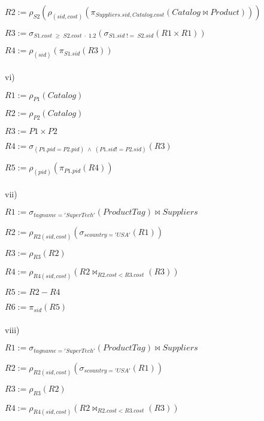 \documentclass[10pt]{article}
\begin{document}
$R2 := \rho_{S2}(\rho_{(sid, cost)}(\pi_{Suppliers.sid, Catalog.cost}(Catalog \bowtie Product)))$

$R3 := \sigma_{S1.cost\;\geq\; S2.cost \; \cdot \;1.2 }(\sigma_{S1.sid\;!= \;S2.sid}(R1 \times R1))$

$R4 := \rho_{(sid)}(\pi_{S1.sid}(R3))$
\\~\\
vi)

$R1 := \rho_{P1}(Catalog)$

$R2 := \rho_{P2}(Catalog)$

$R3 := P1 \times P2$

$R4 := \sigma_{(P1.pid = P2.pid)\; \wedge\; (P1.sid != P2.sid)}(R3)$

$R5 := \rho_{(pid)}(\pi_{P1.pid}(R4))$
\\~\\
vii)

$R1 := \sigma_{tagname='Super Tech'}(ProductTag) \bowtie Suppliers$

$R2 := \rho_{R2(sid, cost)}(\sigma_{scountry = 'USA'}(R1))$

$R3 := \rho_{R3}(R2)$

$R4 := \rho_{R4(sid, cost)}(R2 \bowtie_{R2.cost < R3.cost}(R3))$

$R5 := R2 - R4$

$R6 := \pi_{sid}(R5)$
\\~\\
viii)

$R1 := \sigma_{tagname='Super Tech'}(ProductTag) \bowtie Suppliers$

$R2 := \rho_{R2(sid, cost)}(\sigma_{scountry = 'USA'}(R1))$

$R3 := \rho_{R3}(R2)$

$R4 := \rho_{R4(sid, cost)}(R2 \bowtie_{R2.cost < R3.cost}(R3))$

$R5 := R2 - R4$ [Most Expensive]

$R6 := R2 - R5$ [Table excluding most expensive]

$R7 := \rho_{R7(sid, cost)}(\sigma_{scountry = 'USA'}(R6))$

$R8 := \rho_{R8}(R7)$

$R9 := \rho_{R9(sid, cost)}(R7 \bowtie_{R7.cost < R8.cost}(R8))$

$R10 := R6 - R9$

$R11 := \pi_{sid}(R10)$
\\~\\
ix)

$R1 := \rho_{R1(pid, sid, cost)}(\pi_{Product.pid, Suppliers.sid}(Product \bowtie Catalog))$
\end{document}
